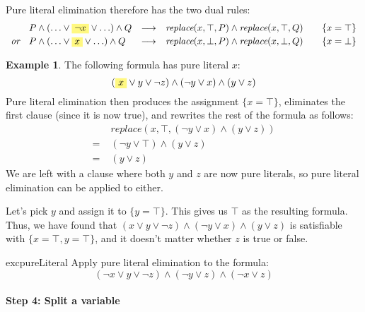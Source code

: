 \documentclass{article}
\theoremstyle{definition}
\newtheorem{example}{Example}
\newcommand{\subst}[3]{\textit{replace}(#2, #1, #3)}
\newcommand{\highlight}[1]{%
  \colorbox{yellow!50}{$\displaystyle#1$}}
\begin{document}
Pure literal elimination therefore has the two dual rules:
%
\begin{align*}
\begin{array}{rlcll}
  & P \wedge (\ldots \vee \highlight{\neg x} \vee \ldots) \wedge Q
  & \longrightarrow & \subst{\top}{x}{P} \wedge \subst{\top}{x}{Q}
& \quad \{x = \top\}
  \\[0.25em]
\textit{or} & P \wedge (\ldots \vee \highlight{x} \vee \ldots) \wedge Q
  & \longrightarrow & \subst{\bot}{x}{P} \wedge \subst{\bot}{x}{Q}
& \quad \{x = \bot\}                     
\end{array}
\end{align*}
%
\begin{example}
The following formula has pure literal $x$:
%
\begin{equation*}
(\highlight{x} \vee y \vee \neg z) \wedge (\neg y \vee x) 
\wedge (y \vee z)
\end{equation*}
%
Pure literal elimination then produces the assignment
$\{x = \top\}$, eliminates the first clause (since it is now true),
and rewrites the rest of the formula as follows:
%
\begin{align*}
  & \subst{\top}{x}{(\neg y \vee x) \wedge (y \vee z)} \\
= \; & (\neg y \vee \top) \wedge (y \vee z) \\
= \; & (y \vee z)
\end{align*}
%
We are left with a clause where both $y$ and $z$ are now pure
literals, so pure literal elimination can be applied to either.

Let's pick $y$ and assign it to $\{y = \top\}$. This gives us $\top$
as the resulting formula.  Thus, we have found that
$({x} \vee y \vee \neg z) \wedge (\neg y \vee x) \wedge (y
\vee z)$
is satisfiable with $\{x = \top, y = \top\}$, and it doesn't matter
whether $z$ is true or false.
\end{example}

\begin{restatable}{exc}{pureLiteral}
Apply pure literal elimination to the formula:
%
\begin{equation*}
(\neg x \vee y \vee \neg z) \wedge (\neg y \vee z) \wedge (\neg x \vee z)
\end{equation*}
%
\end{restatable}

\paragraph{Step 4: Split a variable}
\end{document}
